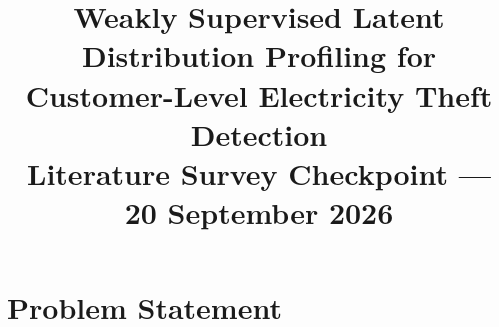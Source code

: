 \documentclass[pdflatex,sn-mathphys-num]{sn-jnl}
\begin{document}
\title[AMP-LDP Literature Survey Checkpoint]
{Weakly Supervised Latent Distribution Profiling for Customer-Level Electricity Theft Detection\\
\large Literature Survey Checkpoint --- 20 September 2026}

\author*[1]{ }

\author[1]{ }

\author[1]{ }


\maketitle

\section{Problem Statement}\label{sec:checkpoint-problem}






\end{document}
